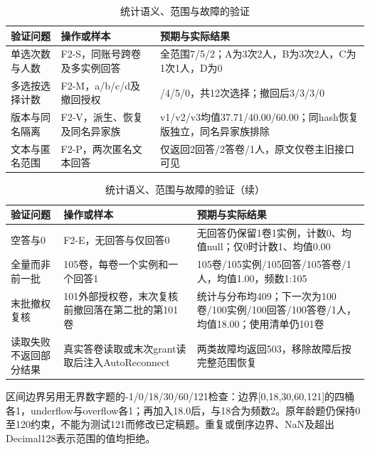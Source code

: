 \begin{table}[H]
\centering\small
\caption{统计语义、范围与故障的验证}
\label{tab:verification}
\setlength{\tabcolsep}{4pt}
\renewcommand{\arraystretch}{1.18}
\begin{tabularx}{\linewidth}{@{}>{\hsize=0.60000\hsize\raggedright\arraybackslash}X>{\hsize=0.84000\hsize\raggedright\arraybackslash}X>{\hsize=1.56000\hsize\raggedright\arraybackslash}X@{}}
\toprule
验证问题 & 操作或样本 & 预期与实际结果\\
\midrule
单选次数与人数 & F2-S，同账号跨卷及多实例回答 & 全范围7/5/2；A为3次2人，B为3次2人，C为1次1人，D为0\\
多选按选择计数 & F2-M，a/b/c/d及撤回授权 & 3/4/5/0，共12次选择；撤回后3/3/3/0\\
版本与同名隔离 & F2-V，派生、恢复及同名异家族 & v1/v2/v3均值37.71/40.00/60.00；同hash恢复版独立，同名异家族排除\\
文本与匿名范围 & F2-P，两次匿名文本回答 & 仅返回2回答/2答卷/1人，原文仅卷主旧接口可见\\
\bottomrule
\end{tabularx}
\end{table}
\begin{table}[H]
\centering\small
\ContinuedFloat
\caption{统计语义、范围与故障的验证（续）}
\label{tab:verification-continued}
\setlength{\tabcolsep}{4pt}
\renewcommand{\arraystretch}{1.18}
\begin{tabularx}{\linewidth}{@{}>{\hsize=0.60000\hsize\raggedright\arraybackslash}X>{\hsize=0.84000\hsize\raggedright\arraybackslash}X>{\hsize=1.56000\hsize\raggedright\arraybackslash}X@{}}
\toprule
验证问题 & 操作或样本 & 预期与实际结果\\
\midrule
空答与0 & F2-E，无回答与仅回答0 & 无回答仍保留1卷1实例，计数0、均值null；仅0时计数1、均值0.00\\
全量而非前一批 & 105卷，每卷一个实例和一个回答1 & 105卷/105实例/105回答/105答卷/1人，均值1.00，频数1:105\\
末批撤权复核 & 101外部授权卷，末次复核前撤回落在第二批的第101卷 & 统计与分布均409；下一次为100卷/100实例/100回答/100答卷/1人，均值18.00；使用清单仍101卷\\
读取失败不返回部分结果 & 真实答卷读取或末次grant读取后注入AutoReconnect & 两类故障均返回503，移除故障后按完整范围恢复\\
\bottomrule
\end{tabularx}
\end{table}

区间边界另用无界数字题的-1/0/18/30/60/121检查：边界{[}0,18,30,60,121{]}的四桶各1，underflow与overflow各1；再加入18.0后，与18合为频数2。原年龄题仍保持0至120约束，不能为测试121而修改已定稿题。重复或倒序边界、NaN及超出Decimal128表示范围的值均拒绝。

